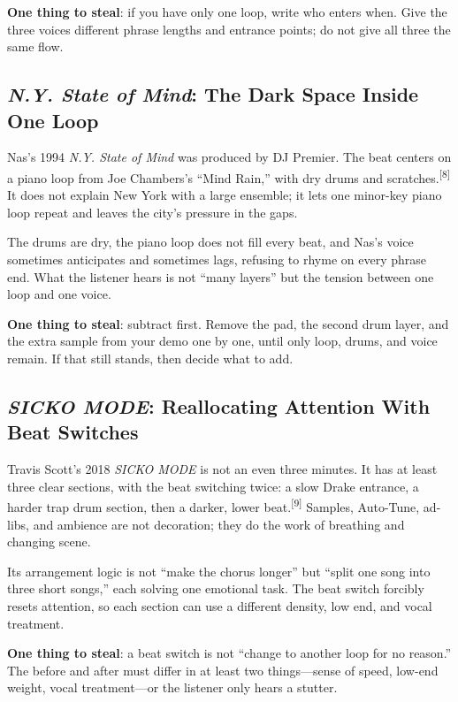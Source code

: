 \textbf{One thing to steal}: if you have only one loop, write who enters when. Give the three voices different phrase lengths and entrance points; do not give all three the same flow.

\subsection{\emph{N.Y. State of Mind}: The Dark Space Inside One Loop}
\label{sec:hiphop-case-ny-state}

Nas's 1994 \emph{N.Y. State of Mind} was produced by DJ Premier. The beat centers on a piano loop from Joe Chambers's ``Mind Rain,'' with dry drums and scratches.{\textsuperscript{[8]}} It does not explain New York with a large ensemble; it lets one minor-key piano loop repeat and leaves the city's pressure in the gaps.

The drums are dry, the piano loop does not fill every beat, and Nas's voice sometimes anticipates and sometimes lags, refusing to rhyme on every phrase end. What the listener hears is not ``many layers'' but the tension between one loop and one voice.

\textbf{One thing to steal}: subtract first. Remove the pad, the second drum layer, and the extra sample from your demo one by one, until only loop, drums, and voice remain. If that still stands, then decide what to add.

\subsection{\emph{SICKO MODE}: Reallocating Attention With Beat Switches}
\label{sec:hiphop-case-sicko}

Travis Scott's 2018 \emph{SICKO MODE} is not an even three minutes. It has at least three clear sections, with the beat switching twice: a slow Drake entrance, a harder trap drum section, then a darker, lower beat.{\textsuperscript{[9]}} Samples, Auto-Tune, ad-libs, and ambience are not decoration; they do the work of breathing and changing scene.

Its arrangement logic is not ``make the chorus longer'' but ``split one song into three short songs,'' each solving one emotional task. The beat switch forcibly resets attention, so each section can use a different density, low end, and vocal treatment.

\textbf{One thing to steal}: a beat switch is not ``change to another loop for no reason.'' The before and after must differ in at least two things---sense of speed, low-end weight, vocal treatment---or the listener only hears a stutter.

